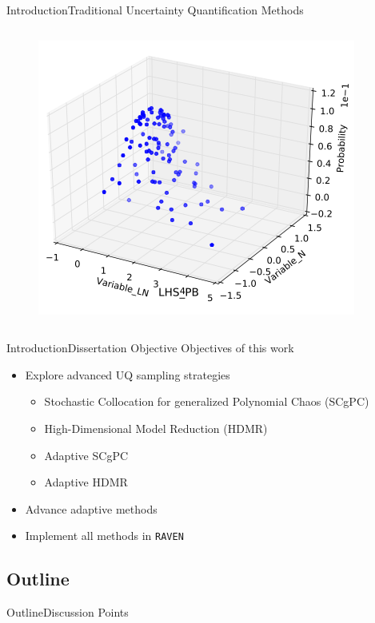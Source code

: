\documentclass{beamer}
\newcommand{\raven}{\texttt{RAVEN}}
\begin{document}
\begin{frame}{Introduction}{Traditional Uncertainty Quantification Methods}
\begin{columns}
\begin{column}{0.45\textwidth}
\begin{figure}[h!]
    \end{figure}
    \vspace{-10pt}
    \begin{figure}[h!]
      \centering
      \includegraphics[width=0.4\linewidth]{lhs_prob}
    \end{figure}
  \end{column}
  \end{columns}
\end{frame}


\begin{frame}{Introduction}{Dissertation Objective}\vspace{-20pt}
  \vfill
Objectives of this work
  \vfill
\begin{itemize}
  \item Explore advanced UQ sampling strategies
    \begin{itemize}
      \item Stochastic Collocation for generalized Polynomial Chaos (SCgPC)
      \item High-Dimensional Model Reduction (HDMR)
      \item Adaptive SCgPC
      \item Adaptive HDMR
    \end{itemize}
  \vfill
  \item Advance adaptive methods
  \vfill
  \item Implement all methods in \raven{}
\end{itemize}
  \vfill
\end{frame}





\subsection{Outline}
\begin{frame}{Outline}{Discussion Points}\vspace{-20pt}
  \begin{columns}
  \begin{column}{0.1\textwidth}
  \end{column}
  \begin{column}{0.9\textwidth}
    \setcounter{tocdepth}{1}
    \tableofcontents[hideothersubsections]%
  \end{column}
  \end{columns}
\end{frame}
\end{document}
